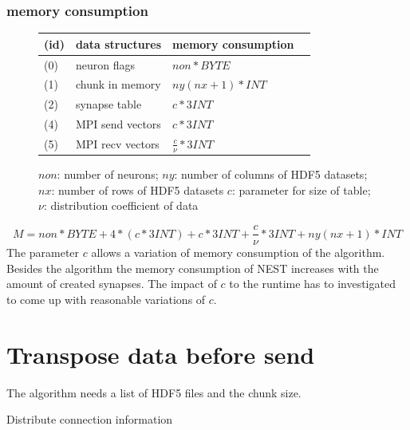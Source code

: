 \documentclass[a4paper]{article}
\begin{document}
\subsubsection{memory consumption}
\begin{figure}[h]
\begin{tabular}{| l | l | l | l |}
    \hline
    (id) & data structures & memory consumption \\ \hline
    (0) & neuron flags & $ non * BYTE $ \\ \hline
    (1) & chunk in memory & $ny (nx+1) * INT$ \\ \hline
    (2) & synapse table & $ c * 3INT $ \\ \hline
    (4) & MPI send vectors & $ c * 3INT $ \\ \hline
    (5) & MPI recv vectors & $ \frac{c}{\nu} * 3INT $ \\ \hline
    \end{tabular}
\caption{$non$: number of neurons; $ny$: number of columns of HDF5 datasets; $nx$: number of rows of HDF5 datasets $c$: parameter for size of table; $\nu$: distribution coefficient of data}
\end{figure}

\begin{equation}
  M = non * BYTE + 4*(c * 3INT) + c * 3INT + \frac{c}{\nu} * 3INT + ny (nx+1) * INT
  \label{eq:c++maxmemoryconsumption}
\end{equation}
The parameter $c$ allows a variation of memory consumption of the algorithm.
Besides the algorithm the memory consumption of NEST increases with the amount of created synapses.
The impact of $c$ to the runtime has to investigated to come up with reasonable variations of $c$.

\newpage
\section{Transpose data before send}
The algorithm needs a list of HDF5 files and the chunk size.
\begin{algorithm}
\label{alg}
\caption{Distribute connection information}
\end{algorithm}
\end{document}
